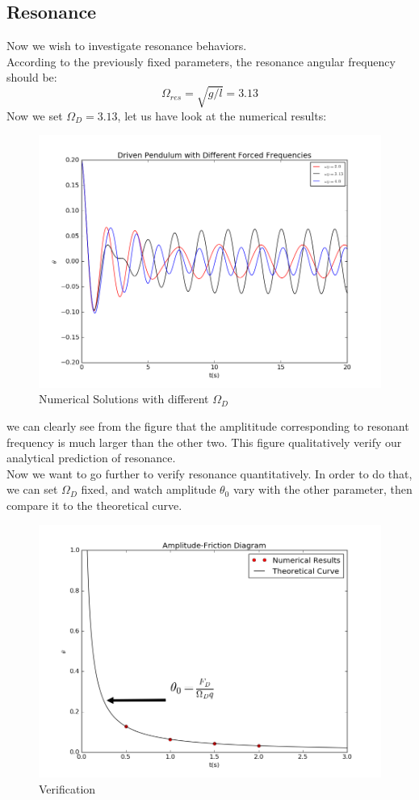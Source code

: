 \documentclass[10pt,a4paper]{article}
\begin{document}
   \subsection{Resonance}
   Now we wish to investigate resonance behaviors.\\
   According to the previously fixed parameters, the resonance angular frequency should be:
   \begin{equation}
   \Omega_{res}=\sqrt{g/l}=3.13
   \end{equation}
   Now we set $\Omega_D=3.13$, let us have look at the numerical results:
   \begin{figure}[htbp]
   	\centering
   	\includegraphics[width=5in]{pendulum_2.png}
   	\caption{Numerical Solutions with different $\Omega_D$}
   \end{figure}
   we can clearly see from the figure that the amplititude corresponding to resonant frequency is much larger than the other two. This figure qualitatively verify our analytical prediction of resonance.\\
   Now we want to go further to verify resonance quantitatively. In order to do that, we can set $\Omega_D$ fixed, and watch amplitude $\theta_0$ vary with the other parameter, then compare it to the theoretical curve.
    \begin{figure}[htbp]
    	\centering
    	\includegraphics[width=5in]{pendulum_3.png}
    	\caption{Verification\label{Figure_3}}
    \end{figure}
\end{document}
